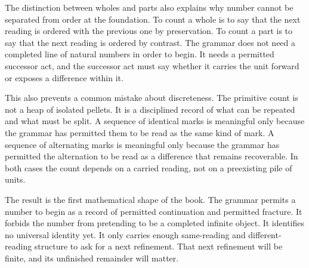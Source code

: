 The distinction between wholes and parts also explains why number cannot
be separated from order at the foundation. To count a whole is to say
that the next reading is ordered with the previous one by preservation.
To count a part is to say that the next reading is ordered by contrast.
The grammar does not need a completed line of natural numbers in order
to begin. It needs a permitted successor act, and the successor act must
say whether it carries the unit forward or exposes a difference within
it.

This also prevents a common mistake about discreteness. The primitive
count is not a heap of isolated pellets. It is a disciplined record of
what can be repeated and what must be split. A sequence of identical
marks is meaningful only because the grammar has permitted them to be
read as the same kind of mark. A sequence of alternating marks is
meaningful only because the grammar has permitted the alternation to be
read as a difference that remains recoverable. In both cases the count
depends on a carried reading, not on a preexisting pile of units.

The result is the first mathematical shape of the book. The grammar
permits a number to begin as a record of permitted continuation and
permitted fracture. It forbids the number from pretending to be a
completed infinite object. It identifies no universal identity yet. It
only carries enough same-reading and different-reading structure to ask
for a next refinement. That next refinement will be finite, and its
unfinished remainder will matter.
